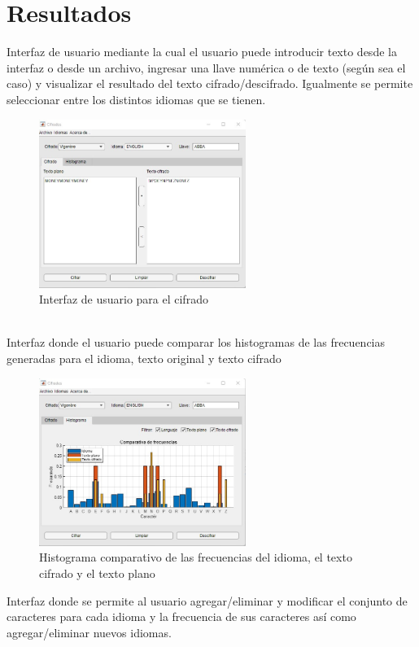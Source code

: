 \documentclass[10pt]{article}
\begin{document}
\section{Resultados}
\justify
Interfaz de usuario mediante la cual el usuario puede introducir texto desde la interfaz o desde un archivo, ingresar una llave numérica o de texto (según sea el caso) y visualizar el resultado del texto cifrado/descifrado.
Igualmente se permite seleccionar entre los distintos idiomas que se tienen.\\
\begin{figure}[!ht]
  \centering
  \includegraphics[width=0.6\textwidth]{GUI_1}
  \caption{Interfaz de usuario para el cifrado}
  \label{fig_sim}
\end{figure}
\\
Interfaz donde el usuario puede comparar los histogramas de las frecuencias generadas para el idioma, texto original y texto cifrado
\begin{figure}[!ht]
  \centering
  \includegraphics[width=0.6\textwidth]{GUI_2}
  \caption{Histograma comparativo de las frecuencias del idioma, el texto cifrado y el texto plano}
  \label{fig_sim}
\end{figure}
\newpage
\justify
Interfaz donde se permite al usuario agregar/eliminar y modificar el conjunto de caracteres para cada idioma y la frecuencia de sus caracteres así como agregar/eliminar nuevos idiomas.\\
\end{document}
